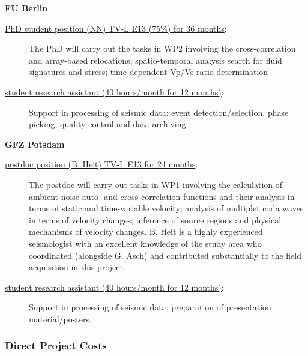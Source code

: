 \documentclass[11pt]{article}
\providecommand{\currfilename}{}
\newcommand{\showfile}{{\bf \tt \color{blue} \currfilename}}
\newcommand{\note}[1]{{\it \color{red} #1}}
\newcommand{\noteft}[1]{{\it \color{magenta} FT:#1}}
\newcommand{\note}[1]{}
\newcommand{\noteft}[1]{}
\newcommand{\showfile}{}
\begin{document}
\textbf{FU Berlin}
\begin{description}
\item[\underline{ PhD student position (NN) TV-L E13 (75\%) for 36 months}:] 
The PhD will carry out the tasks in WP2 involving the cross-correlation and array-based relocations;  spatio-temporal analysis search for fluid signatures and stress; time-dependent Vp/Vs ratio determination  
\item[\underline{ student research assistant (40 hours/month for 12 months)}:] Support in processing of seismic data: event detection/selection, phase picking, quality control and data archiving.
\end{description}
\textbf{GFZ Potsdam} %
\begin{description}\item[\underline{ postdoc position (B. Heit) TV-L E13 for 24 months}:] 
The postdoc will carry out tasks in WP1 involving the calculation of ambient noise auto- and cross-correlation functions and their analysis in terms of static and time-variable velocity; analysis of multiplet coda waves in terms of velocity changes; inference of source regions and physical mechanisms of velocity changes. B. Heit is a highly experienced seismologist with an excellent knowledge of the study area who coordinated (alongside G. Asch) and contributed substantially to the field acquisition in this project.  
\item[\underline{ student research assistant (40 hours/month for 12 months)}:] Support in processing of seismic data, preparation of presentation material/posters.
\end{description}
%

\subsubsection{Direct Project Costs}
\showfile
\end{document}
